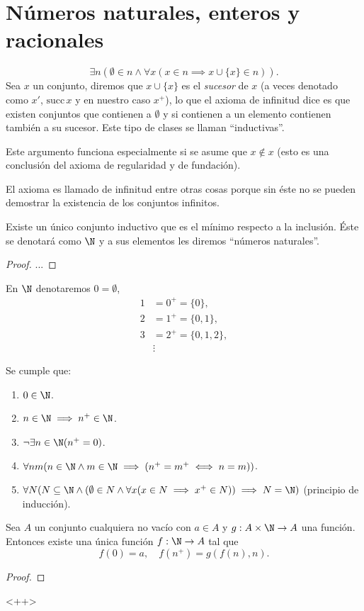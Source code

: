 \documentclass[11pt,a4paper]{book}
\begin{document}
\section{Números naturales, enteros y racionales}
\begin{axiom}
	$$\exists n(\emptyset\in n\wedge\forall x(x\in n\implies x\cup\{x\}\in n)).$$
	Sea $x$ un conjunto, diremos que $x\cup\{x\}$ es el \textit{sucesor} de $x$ (a veces denotado como $x'$, $\text{succ}\,x$ y en nuestro caso $x^+$), lo que el axioma de infinitud dice es que existen conjuntos que contienen a $\emptyset$ y si contienen a un elemento contienen también a su sucesor. Este tipo de clases se llaman ``inductivas''.
\end{axiom}
Este argumento funciona especialmente si se asume que $x\notin x$ (esto es una conclusión del axioma de regularidad y de fundación).

El axioma es llamado de infinitud entre otras cosas porque sin éste no se pueden demostrar la existencia de los conjuntos infinitos.
\begin{thm}
	Existe un único conjunto inductivo que es el mínimo respecto a la inclusión. Éste se denotará como $\N$ y a sus elementos les diremos ``números naturales''.
\end{thm}
\begin{proof}
...
\end{proof}
En $\N$ denotaremos $0=\emptyset$,
\begin{align*}
	1&=0^+=\{0\},\\
	2&=1^+=\{0,1\},\\
	3&=2^+=\{0,1,2\},\\
	&\vdots
\end{align*}
\begin{thm}
	Se cumple que:
	\begin{enumerate}
		\item $0\in\N$.
		\item $n\in\N\implies n^+\in\N$.
		\item $\neg\exists n\in\N(n^+=0)$.
		\item $\forall nm(n\in\N\wedge m\in\N\implies (n^+=m^+\iff n=m))$.
		\item $\forall N(N\subseteq\N\wedge(\emptyset\in N\wedge\forall x(x\in N\implies x^+\in N))\implies N=\N)$ (principio de inducción).
	\end{enumerate}
\end{thm}
\begin{thm}
	Sea $A$ un conjunto cualquiera no vacío con $a\in A$ y $g:A\times\N\rightarrow A$ una función. Entonces existe una única función $f:\N\rightarrow A$ tal que
	$$f(0)=a,\quad f(n^+)=g(f(n),n).$$
\end{thm}
\begin{proof}
	
\end{proof}
<++>
\end{document}
